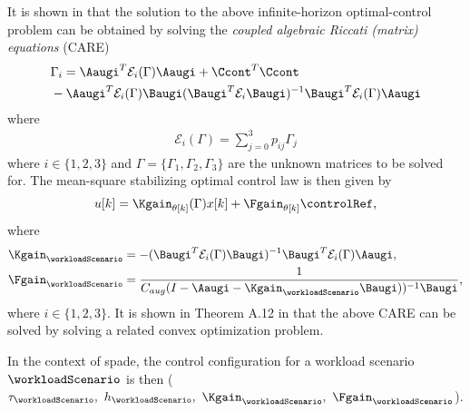 It is shown in \cite{costa2006discrete} that the solution to the above infinite-horizon optimal-control problem can be obtained by solving the {\it coupled algebraic Riccati (matrix) equations} (CARE) 
\small
\begin{align}
\label{eq:care}
&\Gamma_{i} = \Aaugi^T\mathcal{E}_{i}(\Gamma)\Aaugi + \Ccont^T\Ccont \nonumber\\
&- \Aaugi^T\mathcal{E}_i(\Gamma)\Baugi (\Baugi^T\mathcal{E}_i\Baugi)^{-1}\Baugi^T\mathcal{E}_i(\Gamma)\Aaugi \nonumber
\end{align}
\normalsize
 where
 \vspace{-2em}
\begin{align}
\mathcal{E}_i(\Gamma) = \sum\limits_{j = 0}^{3} p_{ij}\Gamma_j \nonumber
\end{align}
where $i \in\{1,2,3\}$ and $\Gamma = \{\Gamma_1,\Gamma_2, \Gamma_3\}$ are the unknown matrices to be solved for. The mean-square stabilizing optimal control law is then given by
\begin{align}
u[k] = \Kgain_{\theta[k]}(\Gamma) x[k] + \Fgain_{\theta[k]} \controlRef, \nonumber
\end{align}
where 
\begin{align}
\Kgain_{\workloadScenario} &= -(\Baugi^T\mathcal{E}_i(\Gamma)\Baugi)^{-1}\Baugi^T\mathcal{E}_i(\Gamma)\Aaugi,\nonumber \\
\Fgain_{\workloadScenario} &= \frac{1}{C_{aug}(I - \Aaugi - \Kgain_{\workloadScenario}\Baugi))^{-1} \Baugi},\nonumber
\end{align}
where $i \in\{1,2,3\}$. It is shown in Theorem A.12 in \cite{costa2006discrete} that the above CARE can be solved by solving a related convex optimization problem.

In the context of \gls{spade}, the control configuration for a workload scenario $\workloadScenario$ is then ($\tau_{\workloadScenario},\ h_{\workloadScenario},\ \Kgain_{\workloadScenario},\ \Fgain_{\workloadScenario}$).